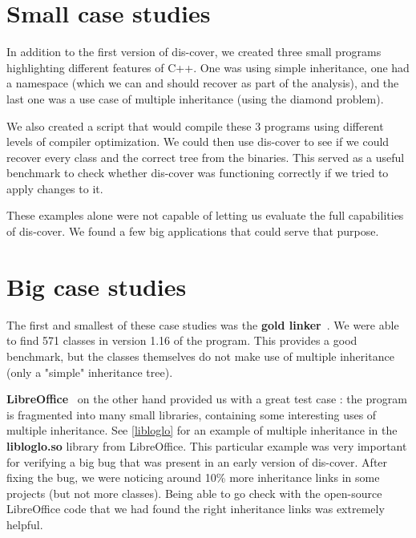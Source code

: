 \documentclass[a4paper,11pt,oneside]{report}
\begin{document}


\section{Small case studies}

In addition to the first version of dis-cover, we created three small programs highlighting different features of C++.
One was using simple inheritance,
one had a namespace (which we can and should recover as part of the analysis),
and the last one was a use case of multiple inheritance (using the diamond problem).

We also created a script that would compile these 3 programs using different levels of compiler optimization.
We could then use dis-cover to see if we could recover every class and the correct tree from the binaries.
This served as a useful benchmark to check whether dis-cover was functioning correctly if we tried to apply changes to it.

These examples alone were not capable of letting us evaluate the full capabilities of dis-cover.
We found a few big applications that could serve that purpose.

\section{Big case studies}

The first and smallest of these case studies was the \textbf{gold linker}~\cite{gold}.
We were able to find 571 classes in version 1.16 of the program.
This provides a good benchmark, but the classes themselves do not make use of multiple inheritance (only a "simple" inheritance tree).

\textbf{LibreOffice}~\cite{libreoffice} on the other hand provided us with a great test case :
the program is fragmented into many small libraries, containing some interesting uses of multiple inheritance.
See \autoref{libloglo} for an example of multiple inheritance in the \textbf{libloglo.so} library from LibreOffice.
This particular example was very important for verifying a big bug that was present in an early version of dis-cover.
After fixing the bug, we were noticing around 10\% more inheritance links in some projects (but not more classes).
Being able to go check with the open-source LibreOffice code that we had found the right inheritance links was extremely helpful.
\end{document}
